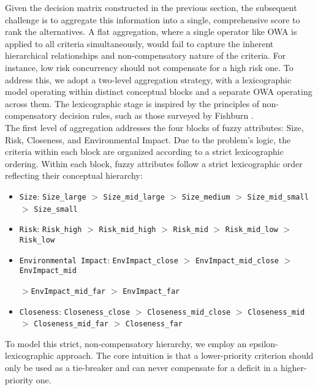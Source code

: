 Given the decision matrix constructed in the previous section, the subsequent challenge is to aggregate this information into a single, comprehensive score to rank the alternatives. A flat aggregation, where a single operator like OWA is applied to all criteria simultaneously, would fail to capture the inherent hierarchical relationships and non-compensatory nature of the criteria. For instance, low risk concurrency should not compensate for a high risk one. To address this, we adopt a two-level aggregation strategy, with a lexicographic model operating within distinct conceptual blocks and a separate OWA operating across them. The lexicographic stage is inspired by the principles of non-compensatory decision rules, such as those surveyed by Fishburn \cite{epsilon}.\\

The first level of aggregation addresses the four blocks of fuzzy attributes: Size, Risk, Closeness, and Environmental Impact. Due to the problem's logic, the criteria within each block are organized according to a strict lexicographic ordering. 
Within each block, fuzzy attributes follow a strict lexicographic order reflecting their conceptual hierarchy:

\begin{itemize}
    \item \texttt{Size}: \texttt{Size\_large} $>$ \texttt{Size\_mid\_large} $>$ \texttt{Size\_medium} $>$ \texttt{Size\_mid\_small} $>$ \texttt{Size\_small}
    
    \item \texttt{Risk}: \texttt{Risk\_high} $>$ \texttt{Risk\_mid\_high} $>$ \texttt{Risk\_mid} $>$ \texttt{Risk\_mid\_low} $>$ \texttt{Risk\_low}
    
    \item \texttt{Environmental Impact}: \texttt{EnvImpact\_close} $>$ \texttt{EnvImpact\_mid\_close} $>$ \texttt{EnvImpact\_mid}
    
    $>$\texttt{EnvImpact\_mid\_far} $>$ \texttt{EnvImpact\_far}
    
    \item \texttt{Closeness}: \texttt{Closeness\_close} $>$ \texttt{Closeness\_mid\_close} $>$ \texttt{Closeness\_mid} $>$ \texttt{Closeness\_mid\_far} $>$ \texttt{Closeness\_far}
\end{itemize}


To model this strict, non-compensatory hierarchy, we employ an epsilon-lexicographic approach. The core intuition is that a lower-priority criterion should only be used as a tie-breaker and can never compensate for a deficit in a higher-priority one.\\



